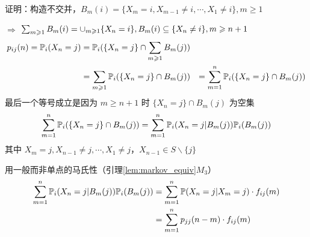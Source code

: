 证明：构造不交并，$B_m(i)=\{X_m=i,X_{m-1}\neq i,\cdots,X_1\neq i\}, m\geq 1$

$\Rightarrow$ $\sum_{m\geqslant 1}B_m(i)=\cup_{m\geqslant 1}\{X_n=i\}, B_m(i)\subseteq \{X_n\neq i\}, m\geqslant n+1$
\[
\begin{aligned}
    p_{ij}(n)=\mathbb{P}_i(X_n=j)&=\mathbb{P}_i(\{X_n=j\}\cap \sum_{m\geqslant 1}B_m(j))\\
    &=\sum_{m\geqslant 1}\mathbb{P}_i(\{X_n=j\}\cap B_m(j))
    &=\sum_{m=1}^n\mathbb{P}_i(\{X_n=j\}\cap B_m(j))
\end{aligned}
\]
最后一个等号成立是因为 $m\geq n+1$ 时 $\{X_n=j\}\cap B_m(j)$ 为空集
\[
\sum_{m=1}^n\mathbb{P}_i(\{X_n=j\}\cap B_m(j))=\sum_{m=1}^n\mathbb{P}_i(X_n=j|B_m(j))\mathbb{P}_i(B_m(j))
\]
其中 $X_m=j,X_{n-1}\neq j,\cdots,X_1\neq j$，$X_{n-1}\in S\backslash \{j\}$

用一般而非单点的马氏性（引理\ref{lem:markov_equiv}$M_3$）
\[
\begin{aligned}
    \sum_{m=1}^n\mathbb{P}_i(X_n=j|B_m(j))\mathbb{P}_i(B_m(j))&=\sum_{m=1}^n\mathbb{P}(X_n=j|X_m=j)\cdot f_{ij}(m)\\
    &=\sum_{m=1}^n p_{jj}(n-m)\cdot f_{ij}(m)
\end{aligned}
\]